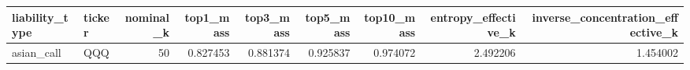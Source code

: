 \begin{tabular}{llrrrrrrr}
\toprule
liability\_type & ticker & nominal\_k & top1\_mass & top3\_mass & top5\_mass & top10\_mass & entropy\_effective\_k & inverse\_concentration\_effective\_k \\
\midrule
asian\_call & QQQ & 50 & 0.827453 & 0.881374 & 0.925837 & 0.974072 & 2.492206 & 1.454002 \\
\bottomrule
\end{tabular}
